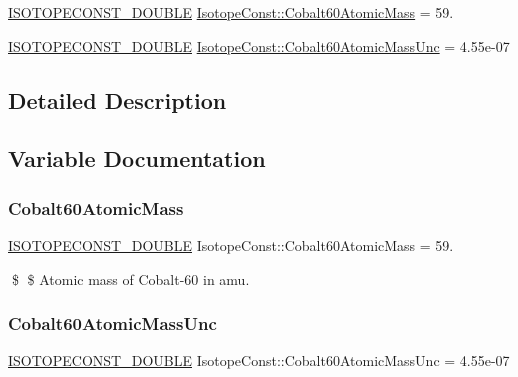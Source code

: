 \begin{DoxyCompactItemize}
\item 
\mbox{\hyperlink{group___isotope_const-_macros_ga8f45a7272ce02c0b4c65c44636ed719a}{I\+S\+O\+T\+O\+P\+E\+C\+O\+N\+S\+T\+\_\+\+D\+O\+U\+B\+LE}} \mbox{\hyperlink{group___isotope_const-_cobalt-_co60_gaaed7d0402841a85815694b934c2f3d7d}{Isotope\+Const\+::\+Cobalt60\+Atomic\+Mass}} = 59.
\item 
\mbox{\hyperlink{group___isotope_const-_macros_ga8f45a7272ce02c0b4c65c44636ed719a}{I\+S\+O\+T\+O\+P\+E\+C\+O\+N\+S\+T\+\_\+\+D\+O\+U\+B\+LE}} \mbox{\hyperlink{group___isotope_const-_cobalt-_co60_ga53fa180548f2d04c046b5e39c2385943}{Isotope\+Const\+::\+Cobalt60\+Atomic\+Mass\+Unc}} = 4.\+55e-\/07
\end{DoxyCompactItemize}


\subsection{Detailed Description}


\subsection{Variable Documentation}
\mbox{\label{group___isotope_const-_cobalt-_co60_gaaed7d0402841a85815694b934c2f3d7d}} 
\subsubsection{\texorpdfstring{Cobalt60\+Atomic\+Mass}{Cobalt60AtomicMass}}
{\footnotesize\ttfamily \mbox{\hyperlink{group___isotope_const-_macros_ga8f45a7272ce02c0b4c65c44636ed719a}{I\+S\+O\+T\+O\+P\+E\+C\+O\+N\+S\+T\+\_\+\+D\+O\+U\+B\+LE}} Isotope\+Const\+::\+Cobalt60\+Atomic\+Mass = 59.}

\$ \$ Atomic mass of Cobalt-\/60 in amu. \mbox{\label{group___isotope_const-_cobalt-_co60_ga53fa180548f2d04c046b5e39c2385943}} 
\subsubsection{\texorpdfstring{Cobalt60\+Atomic\+Mass\+Unc}{Cobalt60AtomicMassUnc}}
{\footnotesize\ttfamily \mbox{\hyperlink{group___isotope_const-_macros_ga8f45a7272ce02c0b4c65c44636ed719a}{I\+S\+O\+T\+O\+P\+E\+C\+O\+N\+S\+T\+\_\+\+D\+O\+U\+B\+LE}} Isotope\+Const\+::\+Cobalt60\+Atomic\+Mass\+Unc = 4.\+55e-\/07}

